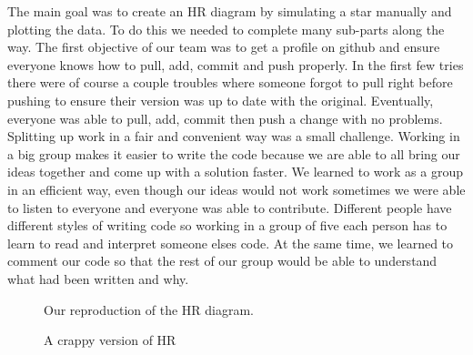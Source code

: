 \documentclass[10pt]{article}
\begin{document}
The main goal was to create an HR diagram by simulating a star manually and plotting the data. To do this we needed to complete many sub-parts along the way. The first objective of our team was to get a profile on github and ensure everyone knows how to pull, add, commit and push properly. In the first few tries there were of course a couple troubles where someone forgot to pull right before pushing to ensure their version was up to date with the original. Eventually, everyone was able to pull, add, commit then push a change with no problems. Splitting up work in a fair and convenient way was a small challenge. Working in a big group makes it easier to write the code because we are able to all bring our ideas together and come up with a solution faster. We learned to work as a group in an efficient way, even though our ideas would not work sometimes we were able to listen to everyone and everyone was able to contribute. Different people have different styles of writing code so working in a group of five each person has to learn to read and interpret someone elses code. At the same time, we learned to comment our code so that the rest of our group would be able to understand what had been written and why.\\

\begin{figure}[p]
 \begin{centering}
  
  \caption{Our reproduction of the HR diagram.}
\label{fig:HR}
 \end{centering}
\end{figure}


\begin{figure}[p]
\begin{centering}

\caption{A crappy version of HR}
\label{fig:badHR}
\end{centering}
\end{figure}
\end{document}
